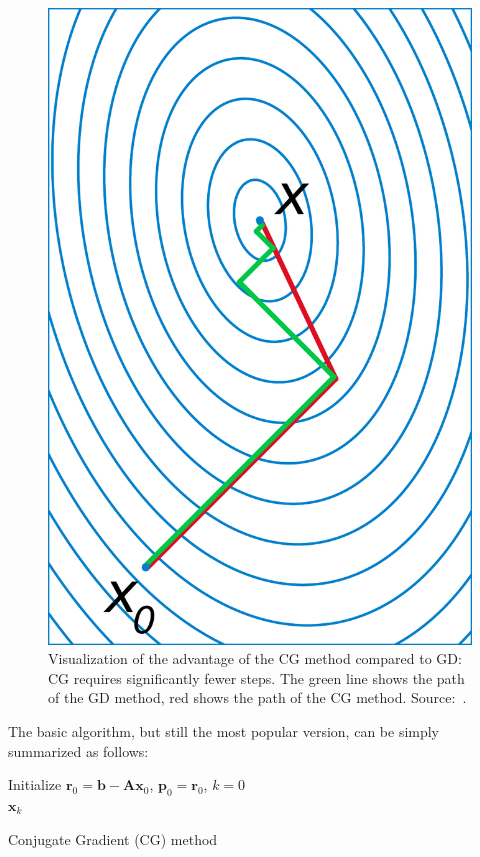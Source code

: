 \begin{figure}
\begin{minipage}[t]{0.255\linewidth}
        \label{fig:grad_desc_problem}
    \end{minipage}
    \hspace{0.01\linewidth}
    \begin{minipage}[t]{0.29\linewidth}
        \centering
        \includegraphics[width=0.45\linewidth]{images/Conjugate_gradient_illustration.pdf}
        \caption{Visualization of the advantage of the CG method compared to GD: CG requires significantly fewer steps. The green line shows the path of the GD method, red shows the path of the CG method. Source:~\cite{alexandrov_illustration_2007}.}
        \label{fig:CG_vs_GD}
    \end{minipage}
\end{figure}

The basic algorithm, but still the most popular version, can be simply summarized as follows:

\begin{algorithm}[H]
    \BlankLine
    Initialize $\mathbf{r}_0 = \mathbf{b} - \mathbf{Ax}_0$, $\mathbf{p}_0 = \mathbf{r}_0$, $k = 0$\\
    \Return $\mathbf{x}_k$
    \caption{Conjugate Gradient (CG) method}
\end{algorithm}

